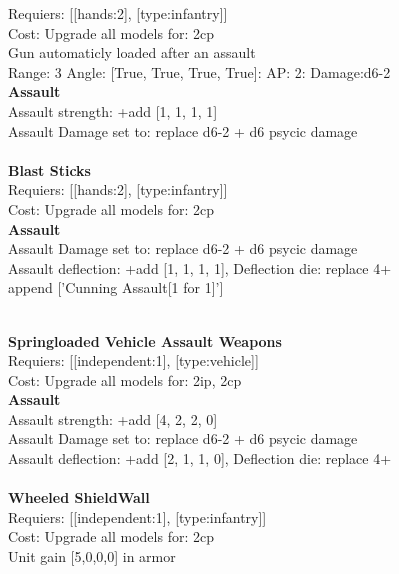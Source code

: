 Requiers: [[hands:2], [type:infantry]] \\
Cost: Upgrade all models for: 2cp \\
Gun automaticly loaded after an assault\\ 


Range: 3  Angle: [True, True, True, True]: AP: 2: Damage:d6-2 \\



{\bf Assault} \ \\
Assault strength: +add [1, 1, 1, 1] 
\\ 
Assault Damage set to: replace d6-2 + d6 psycic damage
\\ 




\ \\
{\bf Blast Sticks } \\

Requiers: [[hands:2], [type:infantry]] \\
Cost: Upgrade all models for: 2cp \\




{\bf Assault} \ \\
Assault Damage set to: replace d6-2 + d6 psycic damage
\\ 
Assault deflection: +add [1, 1, 1, 1], Deflection die: replace 4+
\\ 

append ['Cunning Assault[1 for 1]']


\ \\
{\bf Springloaded Vehicle Assault Weapons } \\

Requiers: [[independent:1], [type:vehicle]] \\
Cost: Upgrade all models for: 2ip, 2cp \\




{\bf Assault} \ \\
Assault strength: +add [4, 2, 2, 0] 
\\ 
Assault Damage set to: replace d6-2 + d6 psycic damage
\\ 
Assault deflection: +add [2, 1, 1, 0], Deflection die: replace 4+
\\ 




\ \\
{\bf Wheeled ShieldWall } \\

Requiers: [[independent:1], [type:infantry]] \\
Cost: Upgrade all models for: 2cp \\
Unit gain [5,0,0,0] in armor\\ 




